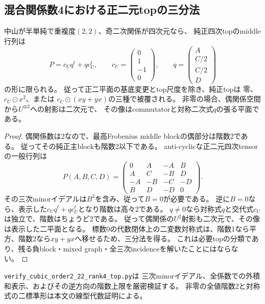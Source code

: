 \subsection{混合関係数4における正二元topの三分法}
\label{subsec:h3-order2-22-rank4-top}
\begin{proposition}\label{prop:h3-order2-22-rank4-positive-top}
中山が半単純で重複度$(2,2)$、奇二次関係が四次元なら、
純正四次topのmiddle行列は
\[
 P=c_U q^t+q c_U^t,\qquad
 c_U=\begin{pmatrix}0\\1\\-1\\0\end{pmatrix},\qquad
 q=\begin{pmatrix}A\\C/2\\C/2\\D\end{pmatrix}
\]
の形に限られる。
従って正二平面の基底変更とtop尺度を除き、純正topは
零、$c_U\mathbin{\odot}x^2$、または
$c_U\mathbin{\odot}(xy+yx)$の三種で被覆される。
非零の場合、偶関係空間から$U^{\otimes2}$への射影は二次元で、
その像はcommutatorと対称二次式$q$の張る平面である。
\end{proposition}
\begin{proof}
偶関係数は2なので、最高Frobenius middle blockの偶部分は階数2である。
従ってその純正主blockも階数2以下である。
anti-cyclicな正二元四次tensorの一般行列は
\[
 P(A,B,C,D)=\begin{pmatrix}
 0&A&-A&B\\A&C&-B&D\\-A&-B&-C&-D\\B&D&-D&0
 \end{pmatrix}.
\]
その三次minorイデアルは$B^3$を含み、従って$B=0$が必要である。
逆に$B=0$なら、表示した$c_Uq^t+qc_U^t$となり階数は高々2である。
$q\ne0$なら対称式$q$と交代式$c_U$は独立で、階数はちょうど2である。
従って偶関係の$U^2$射影も二次元で、その像は表示した二平面となる。
標数0の代数閉体上の二変数対称式は、階数1なら平方、階数2なら$xy+yx$へ移せるため、三分法を得る。
これは必要topの分類であり、残る負block・mixed graph・全三次incidenceを解いたことにはならない。
\end{proof}

\texttt{verify\_cubic\_order2\_22\_rank4\_top.py}は
三次minorイデアル、全係数での外積和表示、およびその逆方向の階数上限を厳密検証する。
非零の全値階数2と対称式の二標準形は本文の線型代数証明による。
